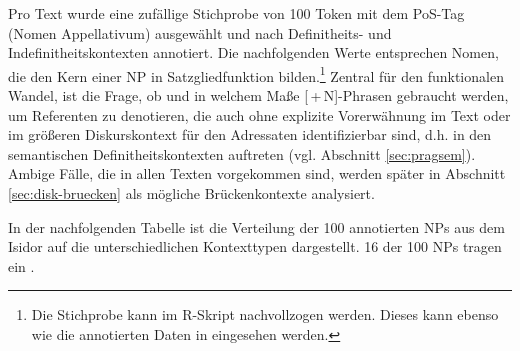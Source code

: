 Pro Text wurde eine zufällige Stichprobe von 100 Token mit dem PoS-Tag  (Nomen Appellativum) ausgewählt und nach Definitheits- und Indefinitheitskontexten annotiert. Die nachfolgenden Werte entsprechen Nomen, die den Kern einer NP in Satzgliedfunktion bilden.\footnote{Die Stichprobe kann im R-Skript  nachvollzogen werden. Dieses kann ebenso wie die annotierten Daten in \textcite{HZKYL4_2020} eingesehen werden.}   
Zentral für den funktionalen Wandel, ist die Frage, ob und in welchem Maße
[\,+\,N]-Phrasen gebraucht werden, um Referenten zu denotieren, die auch ohne explizite Vorerwähnung im Text oder im größeren Diskurskontext für den Adressaten identifizierbar sind, d.h. in den semantischen Definitheitskontexten auftreten (vgl. Abschnitt \ref{sec:pragsem}). Ambige Fälle, die in allen Texten vorgekommen sind, werden später in Abschnitt \ref{sec:disk-bruecken} als mögliche Brückenkontexte analysiert. 


In der nachfolgenden Tabelle ist die Verteilung der 
100 annotierten NPs aus dem Isidor auf die unterschiedlichen Kontexttypen dargestellt. 16 der 100 NPs tragen ein .


